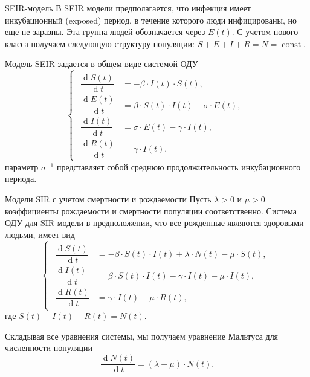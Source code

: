\documentclass[notheorems]{beamer}
\renewcommand{\d}{\operatorname{d}}
\begin{document}

\begin{frame}
	{SEIR-модель}
	В SEIR модели предполагается, что инфекция имеет инкубационный (exposed) период, в течение которого люди инфицированы, но
	еще не заразны. Эта группа людей обозначается через $E(t)$. С учетом нового класса получаем следующую структуру
	популяции:
	$S + E + I + R = N = \operatorname{const}.$
	
	Модель SEIR задается в общем виде системой ОДУ
	\begin{equation}
		\left\{ 
		\begin{gathered} 
			\begin{aligned}
				\dfrac {\d S(t)}{\d t} &= - \beta \cdot I(t)\cdot S(t),\\
				\dfrac {\d E(t)}{\d t} &= \beta \cdot S(t)\cdot I(t) - \sigma\cdot E(t),\\
				\dfrac{\d I(t)}{\d t} &=\sigma \cdot E(t) - \gamma\cdot I(t),\\
				\dfrac{\d R(t)}{\d t} &= \gamma\cdot I(t). 
			\end{aligned}
		\end{gathered} 
		\right.
	\end{equation}
	параметр $\sigma^{-1}$ представляет собой среднюю продолжительность инкубационного периода.
\end{frame}


\begin{frame}
	{Модели SIR с учетом смертности и рождаемости}
	Пусть $\lambda > 0$ и $\mu > 0$ коэффициенты рождаемости и смертности популяции соответственно. Система ОДУ для SIR-модели в предположении, что все рожденные являются здоровыми людьми, имеет вид 
	\begin{equation}
		\left\{ 
		\begin{gathered} 
			\begin{aligned}
				\dfrac {\d S(t)}{\d t} &= -\beta \cdot S(t) \cdot I(t) + \lambda\cdot N(t) - \mu\cdot S(t),\\
				\dfrac{\d I(t)}{\d t} &= \beta \cdot S(t)\cdot I(t) - \gamma\cdot I(t) - \mu\cdot I(t),\\
				\dfrac{\d R(t)}{\d t} &= \gamma\cdot I(t) - \mu \cdot R(t),
			\end{aligned}
		\end{gathered} 
		\right.
	\end{equation}
	где $S(t) + I(t) + R(t) = N(t).$
	
	Складывая все уравнения системы, мы получаем уравнение Мальтуса для численности популяции 
	\begin{equation}
		\dfrac{\d N(t)}{\d t} = (\lambda-\mu) \cdot N(t).
	\end{equation}
\end{frame}
\end{document}
